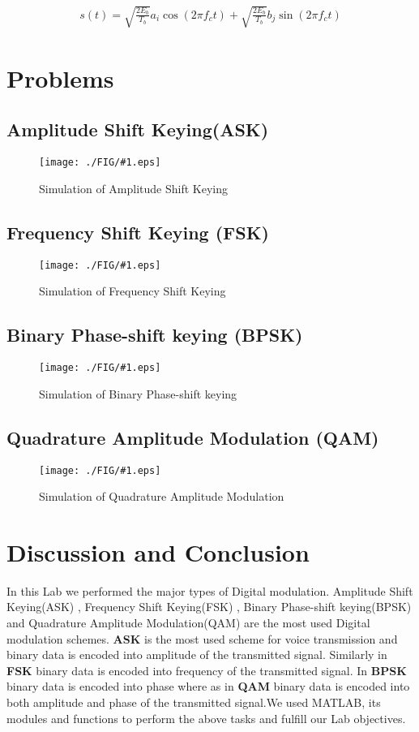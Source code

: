\documentclass[a4paper,11pt]{article}
\newcommand{\mobs}[2]{
    \begin{figure}[H]
        \centering
        \texttt{[image: ./FIG/\#1.eps]}
        \caption{#2}
    \end{figure}
   
}
\begin{document}
\def\samp { \sqrt{\frac{2E_b}{T_b}} }

\begin{align*}
    s(t) = \samp a_i \cos{(2\pi f_c t)} + \samp b_j \sin{(2\pi f_c t)}
\end{align*}





\pagebreak
\section{Problems}

\subsection{Amplitude Shift Keying(ASK)}
\mobs{ASK}{Simulation of Amplitude Shift Keying}


\subsection{Frequency Shift Keying (FSK)}
\mobs{FSK}{Simulation of Frequency Shift Keying}



\subsection{Binary Phase-shift keying (BPSK)}
\mobs{BPSK}{Simulation of Binary Phase-shift keying}



\subsection{Quadrature Amplitude Modulation (QAM)}
\mobs{QAM}{Simulation of Quadrature Amplitude Modulation}



\section{Discussion and Conclusion}
In this Lab we performed the major types of Digital modulation. Amplitude Shift Keying(ASK) , Frequency Shift Keying(FSK) , Binary Phase-shift keying(BPSK) and Quadrature Amplitude Modulation(QAM) are the most used Digital modulation schemes. \textbf{ASK} is the most used scheme for voice transmission and binary data is encoded into amplitude of the transmitted signal. Similarly in \textbf{FSK} binary data is encoded into frequency of the transmitted signal. In \textbf{BPSK} binary data is encoded into phase where as in \textbf{QAM}  binary data is encoded into both amplitude and phase of the transmitted signal.We used MATLAB, its modules and functions to perform the above tasks and fulfill our Lab objectives.
\end{document}
